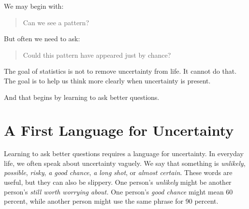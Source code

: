 \documentclass[
  letterpaper,
  DIV=11,
  numbers=noendperiod]{scrreprt}
\begin{document}
We may begin with:

\begin{quote}
Can we see a pattern?
\end{quote}

But often we need to ask:

\begin{quote}
Could this pattern have appeared just by chance?
\end{quote}

The goal of statistics is not to remove uncertainty from life. It cannot
do that. The goal is to help us think more clearly when uncertainty is
present.

And that begins by learning to ask better questions.

\section{A First Language for
Uncertainty}\label{a-first-language-for-uncertainty}

Learning to ask better questions requires a language for uncertainty. In
everyday life, we often speak about uncertainty vaguely. We say that
something is \emph{unlikely}, \emph{possible}, \emph{risky}, \emph{a
good chance}, \emph{a long shot}, or \emph{almost certain}. These words
are useful, but they can also be slippery. One person's \emph{unlikely}
might be another person's \emph{still worth worrying about.} One
person's \emph{good chance} might mean 60 percent, while another person
might use the same phrase for 90 percent.
\end{document}
